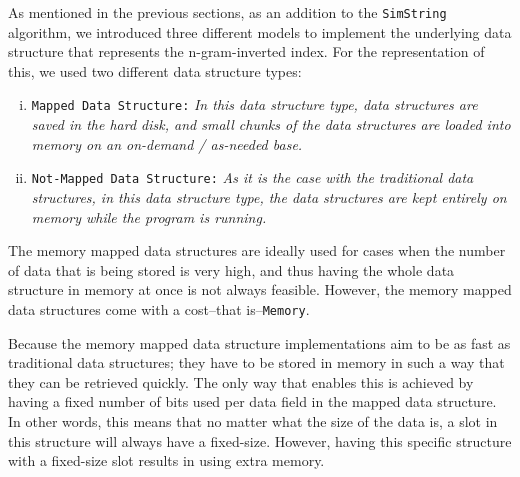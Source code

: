 As mentioned in the previous sections, as an addition to the \texttt{SimString} algorithm, we introduced three different models to implement the underlying data structure that represents the n-gram-inverted index. For the representation of this, we used two different data structure types:
\begin{enumerate}[i.]
	\item \texttt{Mapped Data Structure:} \textit{In this data structure type, data structures are saved in the hard disk, and small chunks of the data structures are loaded into memory on an on-demand / as-needed base.}
	\item \texttt{Not-Mapped Data Structure:} \textit{As it is the case with the traditional data structures, in this data structure type, the data structures are kept entirely on memory while the program is running.}
\end{enumerate}

The memory mapped data structures are ideally used for cases when the number of data that is being stored is very high, and thus having the whole data structure in memory at once is not always feasible. However, the memory mapped data structures come with a cost--that is--\texttt{Memory}.

Because the memory mapped data structure implementations aim to be as fast as traditional data structures; they have to be stored in memory in such a way that they can be retrieved quickly. The only way that enables this
is achieved by having a fixed number of bits used per data field in the mapped data structure. In other words, this means that no matter what the size of the data is, a slot in this structure will always have a fixed-size. However, having this specific structure with a fixed-size slot results in using extra memory.

